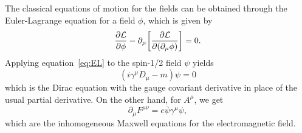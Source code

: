 The classical equations of motion for the fields can be obtained through the Euler-Lagrange equation for a field $\phi$, which is given by
\begin{equation}\label{eq:EL}
  \pdv{\mathcal{L}}{\phi}-\partial_\mu\bqty{\pdv{\mathcal{L}}{(\partial_\mu\phi)}}=0.
\end{equation}
Applying equation~\ref{eq:EL} to the spin-1/2 field $\psi$ yields
\begin{equation}
  (i\gamma^\mu D_\mu-m)\psi=0
\end{equation}
which is the Dirac equation with the gauge covariant derivative in place of the usual partial derivative.
On the other hand, for $A^\mu$, we get
\begin{equation}
  \partial_\mu F^{\mu\nu}=e\bar{\psi}\gamma^\mu\psi,
\end{equation}
which are the inhomogeneous Maxwell equations for the electromagnetic field.




